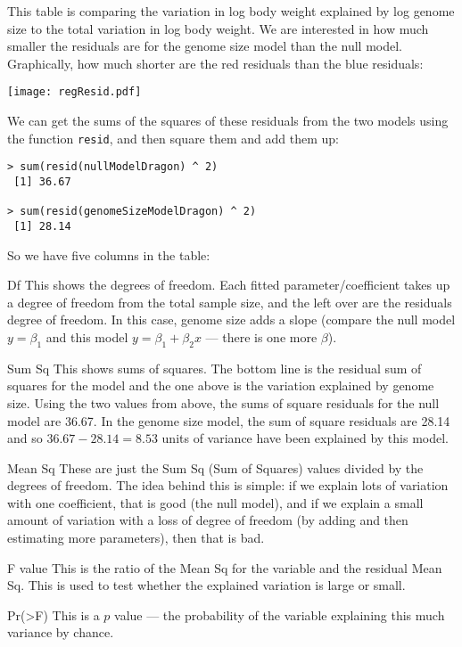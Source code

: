 This table is comparing the variation in log body weight explained by 
log genome size to the total variation in log body weight. We are 
interested in how much smaller the residuals are for the genome size 
model than the null model. Graphically, how much shorter are the red 
residuals than the blue residuals:

\begin{center}
\texttt{[image: regResid.pdf]} 
\end{center}

We can get the sums of the squares of these residuals from the two 
models using the function {\tt resid}, and then square them and add 
them up:

\begin{lstlisting}
> sum(resid(nullModelDragon) ^ 2)
 [1] 36.67
 
> sum(resid(genomeSizeModelDragon) ^ 2)
 [1] 28.14
\end{lstlisting}

So we have five columns in the table:
\begin{compactdesc}
	\item[Df] This shows the degrees of freedom. Each fitted parameter/coefficient takes up 
	a degree of freedom from the total sample size, and the left over are the residuals degree of freedom. In this 
	case, genome size adds a slope (compare the null model $y=\beta_1$ 
	and this model $y=\beta_1 + \beta_2x$ --- there is one more $\beta$). 
	\item[Sum Sq] This shows sums of squares. The bottom line is the 
	residual sum of squares for the model and the one above is the 
	variation explained by genome size. Using the two values from above, 
	the sums of square residuals for the null model are 36.67. In the 
	genome size model, the sum of square residuals are 28.14 and so 
	$36.67-28.14=8.53$ units of variance have been explained by this 
	model.
	\item[Mean Sq] These are just the Sum Sq (Sum of Squares) values divided by the 
	degrees of freedom. The idea behind this is simple: if we explain 
	lots of variation with one coefficient, that is good (the null model), and if we explain a 
	small amount of variation with a loss of degree of freedom (by adding and then estimating more parameters), then that is bad.
	\item[F value] This is the ratio of the Mean Sq for the variable and 
	the residual Mean Sq. This is used to test whether the explained 
	variation is large or small.
	\item[Pr(>F)] This is a $p$ value --- the probability of the variable 
	explaining this much variance by chance. 
\end{compactdesc}

